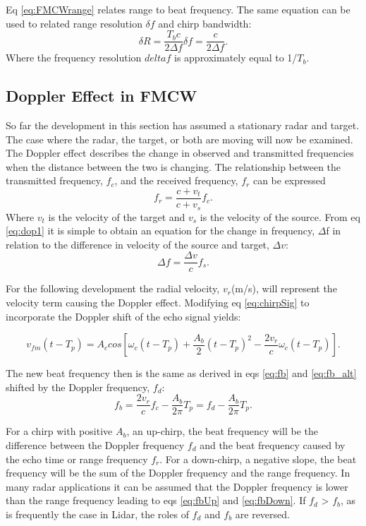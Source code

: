 Eq \ref{eq:FMCWrange} relates range to beat frequency. The same equation can be used
to related range resolution $\delta$$f$ and chirp bandwidth:
\begin{equation}
	\label{eq:FMCWres}
	\delta R=\frac{T_bc}{2\Delta f}\delta f=\frac{c}{2\Delta f}.
\end{equation}
Where the frequency resolution $delta$$f$ is approximately equal to 1/$T_b$. 

\subsection{Doppler Effect in FMCW}
So far the development in this section has assumed a stationary radar and target. The 
case where the radar, the target, or both are moving will now be examined. The Doppler 
effect describes the change in observed and transmitted frequencies when the distance 
between the two is changing. The relationship between the transmitted frequency, $f_c$, 
and the received frequency, $f_r$ can be expressed
\begin{equation}
	\label{eq:dop1}
	f_r=\frac{c+v_t}{c+v_s}f_c.
\end{equation}
Where $v_t$ is the velocity of the target and $v_s$ is the velocity of the source. From
eq \ref{eq:dop1} it is simple to obtain an equation for the change in frequency, $\Delta$f
in relation to the difference in velocity of the source and target, $\Delta$$v$:
\begin{equation}
\label{eq:dop2}
\Delta f=\frac{\Delta v}{c}f_s.
\end{equation}
 
For the following development the radial velocity, $v_r$(m/s), will represent the velocity 
term causing the Doppler effect. Modifying eq \ref{eq:chirpSig} to incorporate the Doppler 
shift of the echo signal yields:
 
\begin{equation}
	\label{eq:chirpSigDop}
	v_{fm}(t-T_p)=A_c cos[\omega_c(t-T_p)+\frac{A_b}{2} (t-T_p)^2-\frac{2v_r}{c}\omega_c(t-T_p)].
\end{equation}
  
The new beat frequency then is the same as derived in eqs \ref{eq:fb} and \ref{eq:fb_alt} shifted
by the Doppler frequency, $f_d$:
\begin{equation}
	\label{eq:fbDop}
	f_b=\frac{2v_r}{c}f_c-\frac{A_b}{2\pi}T_p
	  =f_d-\frac{A_b}{2\pi}T_p.
\end{equation}

For a chirp with positive $A_b$, an up-chirp, the beat frequency will be the difference between 
the Doppler frequency $f_d$ and the beat frequency caused by the echo time or range frequency $f_r$. For a down-chirp, a negative
slope, the beat frequency will be the sum of the Doppler frequency and the range frequency. In many radar applications
it can be assumed that the Doppler frequency is lower than the range frequency leading to eqs \ref{eq:fbUp} and \ref{eq:fbDown}.
If $f_d$ > $f_b$, as is frequently the case in Lidar, the roles of $f_d$ and $f_b$ are reversed. 

